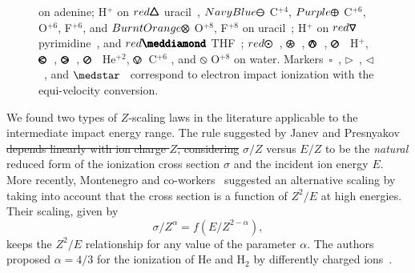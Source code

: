 \documentclass[10pt,showpacs,showkeys,twocolumn]{revtex4-1}
\providecommand{\DIFadd}[1]{{\protect\color{blue}\uwave{#1}}} %
\providecommand{\DIFdel}[1]{{\protect\color{red}\sout{#1}}}                      %
\providecommand{\DIFaddbegin}{} %
\providecommand{\DIFaddend}{} %
\providecommand{\DIFdelbegin}{} %
\providecommand{\DIFdelend}{} %
\newcommand{\DIFscaledelfig}{0.5}
\newlength{\DIFdelgraphicswidth} %
\newlength{\DIFdelgraphicsheight} %
\newcommand{\DIFaddincludegraphics}[2][]{{\color{blue}\fbox{\DIFOincludegraphics[#1]{#2}}}} %
\newcommand{\DIFdelincludegraphics}[2][]{%
\sbox{\DIFdelgraphicsbox}{\DIFOincludegraphics[#1]{#2}}%
\settoboxwidth{\DIFdelgraphicswidth}{\DIFdelgraphicsbox} %
\settoboxtotalheight{\DIFdelgraphicsheight}{\DIFdelgraphicsbox} %
\scalebox{\DIFscaledelfig}{%
\parbox[b]{\DIFdelgraphicswidth}{\usebox{\DIFdelgraphicsbox}\\[-\baselineskip] \rule{\DIFdelgraphicswidth}{0em}}\llap{\resizebox{\DIFdelgraphicswidth}{\DIFdelgraphicsheight}{%
\setlength{\unitlength}{\DIFdelgraphicswidth}%
\begin{picture}(1,1)%
\thicklines\linethickness{2pt} %
{\color[rgb]{1,0,0}\put(0,0){\framebox(1,1){}}}%
{\color[rgb]{1,0,0}\put(0,0){\line( 1,1){1}}}%
{\color[rgb]{1,0,0}\put(0,1){\line(1,-1){1}}}%
\end{picture}%
}\hspace*{3pt}}} %
} %
\DeclareRobustCommand{\DIFaddbegin}{\DIFOaddbegin \let\includegraphics\DIFaddincludegraphics} %
\DeclareRobustCommand{\DIFaddend}{\DIFOaddend \let\includegraphics\DIFOincludegraphics} %
\DeclareRobustCommand{\DIFdelbegin}{\DIFOdelbegin \let\includegraphics\DIFdelincludegraphics} %
\DeclareRobustCommand{\DIFdelend}{\DIFOaddend \let\includegraphics\DIFOincludegraphics} %
\begin{document}
\begin{figure}[!htb]
{\cite{tribedi2019} on adenine;
H$^+$ on {\fontsize{11}{20}$\color{red}\pmb{\triangle}$} uracil~\cite{itoh2013}, 
{\fontsize{11}{20}$\color{NavyBlue}\pmb{\ominus}$} C$^{+4}$, 
{\fontsize{11}{20}$\color{Purple}\pmb{\oplus}$} C$^{+6}$, O$^{+6}$, F$^{+6}$, and 
{\fontsize{11}{20}$\color{BurntOrange}\pmb{\otimes}$} O$^{+8}$, 
F$^{+8}$ on uracil~\cite{agnihotri2012,agnihotri2013};
H$^+$ on {\fontsize{11}{20}$\color{red}\pmb{\triangledown}$} 
pyrimidine~\cite{wolff2014}, and 
{\fontsize{10}{20}$\color{red}\pmb{\meddiamond}$} THF~\cite{wang2016};
\mbox{\fontsize{11}{20}$\color{red}\pmb{\odot}$}~\cite{Luna2007}, 
{\fontsize{11}{20}\color{red}$\pmb{\logof}$}~\cite{Rudd86}, 
{\fontsize{11}{20}\color{red}$\pmb{\varowedge}$}~\cite{pRudd85}, 
{\fontsize{11}{20}\color{red}$\pmb{\varoslash}$}~\cite{toburen80} H$^+$,
{\fontsize{11}{20}\color{ForestGreen}$\pmb{\varolessthan}$}~\cite{Ohsawa05},
{\fontsize{11}{20}\color{ForestGreen}$\pmb{\varogreaterthan}$}~\cite{Rudd85},
{\fontsize{11}{20}\color{ForestGreen}$\pmb{\varoslash}$}~\cite{toburen80} He$^{+2}$,
{\fontsize{11}{20}\color{Purple}$\pmb{\ovee}$}~C$^{+6}$ \cite{DalCappello2009,Bhattacharjee17}, and 
{\fontsize{11}{20}\color{BurntOrange}$\pmb{\obslash}$}
O$^{+8}$ \cite{Tribedi_O_water} on water.
Markers~$\square$~\cite{rahman2016}, 
$\rhd$~\cite{bug2017}, 
$\lhd$~\cite{wolf2019}, and 
$\medstar$~\cite{fuss2009} correspond to electron impact ionization with 
the equi-velocity conversion.}
\label{fig:zreduced}
\end{figure} 

We found two types of $Z$-scaling laws in the literature applicable 
to the intermediate impact energy range. The rule suggested by Janev 
and Presnyakov~\cite{janev1980} 
\DIFdelbegin \DIFdel{depends linearly with ion charge $Z$, 
considering }\DIFdelend %
\DIFaddbegin \DIFadd{considers }\DIFaddend $\sigma/Z$ versus $E/Z$ to be the \textit{natural} reduced  
form of the ionization cross section $\sigma$ and the incident ion energy $E$. More recently, Montenegro and co-workers~\cite{dubois13,
montenegro_pra13} suggested an alternative scaling by taking into 
account that the cross section is a function of $Z^2/E$ at high 
energies. Their scaling, given by 
\begin{equation}
 \sigma/Z^{\alpha}=f(E/Z^{2-\alpha}),
\label{eq:Montenegro}
\end{equation}
keeps the $Z^2/E$ relationship for any value of the parameter 
$\alpha$. The authors proposed $\alpha=4/3$ for the ionization of He and 
H$_2$ by differently charged ions~\cite{dubois13}. 
\end{document}
